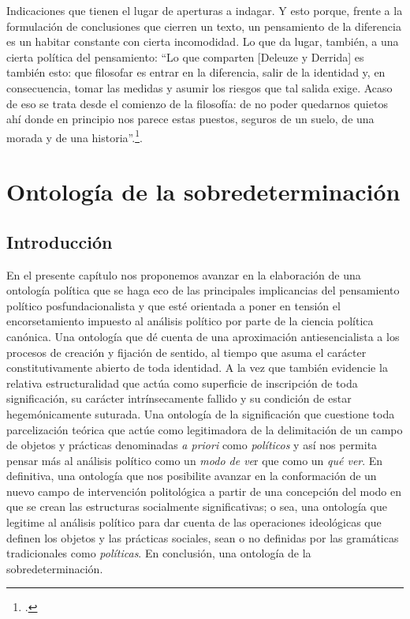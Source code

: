 \documentclass{book}
\begin{document}
Indicaciones que tienen el lugar de aperturas a indagar. Y esto porque,
frente a la formulación de conclusiones que cierren un texto, un
pensamiento de la diferencia es un habitar constante con cierta
incomodidad. Lo que da lugar, también, a una cierta política del
pensamiento: \enquote{Lo que comparten {[}Deleuze y Derrida{]} es también esto:
que filosofar es entrar en la diferencia, salir de la identidad y, en
consecuencia, tomar las medidas y asumir los riesgos que tal salida
exige. Acaso de eso se trata desde el comienzo de la filosofía: de no
poder quedarnos quietos ahí donde en principio nos parece estas puestos,
seguros de un suelo, de una morada y de una historia}.\footcite[261]{nancy2008}.

\chapter{Ontología de la sobredeterminación}
\author{Andrés Daín}

\section{Introducción}

En el presente capítulo nos proponemos avanzar en la elaboración de una
ontología política que se haga eco de las principales implicancias del
pensamiento político posfundacionalista y que esté orientada a poner en
tensión el encorsetamiento impuesto al análisis político por parte de la
ciencia política canónica. Una ontología que dé cuenta de una
aproximación antiesencialista a los procesos de creación y fijación de
sentido, al tiempo que asuma el carácter constitutivamente abierto de
toda identidad. A la vez que también evidencie la relativa
estructuralidad que actúa como superficie de inscripción de toda
significación, su carácter intrínsecamente fallido y su condición de
estar hegemónicamente suturada. Una ontología de la significación que
cuestione toda parcelización teórica que actúe como legitimadora de la
delimitación de un campo de objetos y prácticas denominadas \emph{a
priori} como \emph{políticos} y así nos permita pensar más al análisis
político como un \emph{modo de ve}r que como un \emph{qué ver}. En
definitiva, una ontología que nos posibilite avanzar en la conformación
de un nuevo campo de intervención politológica a partir de una
concepción del modo en que se crean las estructuras socialmente
significativas; o sea, una ontología que legitime al análisis político
para dar cuenta de las operaciones ideológicas que definen los objetos y
las prácticas sociales, sean o no definidas por las gramáticas
tradicionales como \emph{políticas}. En conclusión, una ontología de la
sobredeterminación.
\end{document}
